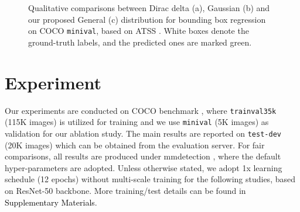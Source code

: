 \documentclass{article}
\begin{document}
\begin{figure}[t]
	\begin{center}
		\setlength{\fboxrule}{0pt}
	\end{center}	
	\vspace{-12pt}
	\caption{Qualitative comparisons between Dirac delta (a), Gaussian (b) and our proposed General (c) distribution for bounding box regression on COCO {\tt minival}, based on ATSS \cite{zhang2019bridging}. White boxes denote the ground-truth labels, and the predicted ones are marked green.}
	\label{fig_unimodal}
	\vspace{-14pt}
\end{figure}
\section{Experiment}
Our experiments are conducted on COCO benchmark \cite{lin2014microsoft}, where {\tt trainval35k} (115K images) is utilized for training and we use {\tt minival} (5K images) as validation for our ablation study. The main results are reported on {\tt test-dev} (20K images) which can be obtained from the evaluation server. For fair comparisons, all results are produced under mmdetection \cite{chen2019mmdetection}, where the default hyper-parameters are adopted. Unless otherwise stated, we adopt 1x learning schedule (12 epochs) without multi-scale training for the following studies, based on ResNet-50 \cite{he2016deep} backbone. More training/test details can be found in \textcolor{black}{Supplementary Materials}.
\end{document}

